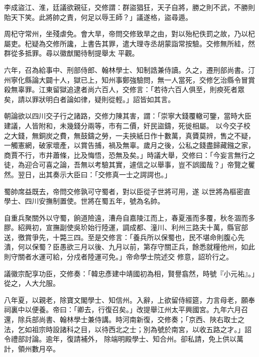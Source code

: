 \begin{pinyinscope}
 李成盜江、淮，廷議欲親征，交修謂：群盜猖狂，天子自將，勝之則不武，不勝則貽天下笑。此將帥之責，何足以辱王師？」議遂格，盜尋遁。



 周杞守常州，坐殘虐免。會大旱，帝問交修致旱之由，對以殆杞佚罰之故，乃以杞屬吏。杞疑為交修所讒，上書告其罪，遣大理寺丞胡蒙詣常按驗。交修無所絓，然群從多抵罪。尋以徽猷閣待制提舉太
 平觀。



 六年，召為給事中、刑部侍郎、翰林學士、知制誥兼侍讀。久之，遷刑部尚書。汀州寧化縣論大闢十人，獄已上，知州事鄭強驗問，無一人當死，交修乞治縣令冒賞殺無辜罪。江東留獄追逮者尚六百人，交修言：「若待六百人俱至，則瘐死者眾矣，請以罪狀明白者論如律，疑則從輕。」詔皆如其言。



 朝論欲以四川交子行之諸路，交修力陳其害，謂：「崇寧大錢覆轍可鑒，當時大臣建議，人皆附和，未幾錢分兩等，市有二價，奸民盜鑄，死徙相屬。
 以今交子校之大錢，無銅炭之費，無鼓鑄之勞，一夫挾紙日作十數萬，真贗莫辨，售之不疑，一觸憲網，破家壞產，以賞告捕，禍及無辜。歲月之後，公私之錢盡歸藏鏹之家，商賈不行，市井蕭條，比及悔悟，恐無及矣。」時議大舉，交修曰：「今妄言無行之徒，為迎合可喜之論，吾無以考驗其實，遽信之以舉事，豈不誤國哉？」帝覽之矍然。翌日，出其奏示大臣曰：「交修真一士之諤諤也。」



 蜀帥席益既去，帝問交修孰可守蜀者，對以臣從子世將可用，遂
 以世將為樞密直學士、四川安撫制置使。世將在蜀五年，號為名帥。



 自重兵聚關外以守蜀，餉道險遠，漕舟自嘉陵江而上，春夏漲而多覆，秋冬涸而多膠。紹興初，宣撫副使吳玠始行陸運，調成都、潼川、利州三路夫十萬，縣官部送，徼賞爭先，十斃三四。至是交修言：「養兵所以保蜀也，民不堪命則腹心先潰，何以保蜀？臣愚欲三月以後、九月以前，第存守關正兵，餘悉就糧他州，如此則守關者水運可給，分戍者陸運可免。」帝命學士院述交
 修意，詔玠行之。



 議徽宗配享功臣，交修奏：「韓忠彥建中靖國初為相，賢譽翕然，時號『小元祐』。」從之，人大允服。



 八年夏，以親老，除寶文閣學士、知信州。入辭，上欲留侍經筵，力言母老，願奉祠裏中以便養。帝曰：「卿去，行復召矣。」改提舉江州太平興國宮。九年六月召還，除兵部尚書、翰林學士兼侍講。時河南新復，交修奏；「京西、陜右取士之法，乞如祖宗時設諸科之目，以待西北之士；別為號於南宮，以收五路之才。」詔令禮部討論。逾年，復請補外，
 除端明殿學士、知合州。卻私請，免上供以萬計，領州數月卒。




\end{pinyinscope}
